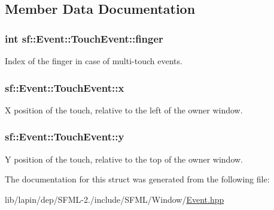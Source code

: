 \subsection{Member Data Documentation}
\hypertarget{structsf_1_1_event_1_1_touch_event_a9a79fe86bf9ac3c16ec7326f96feb61a}{
\subsubsection[{finger}]{ {\bf int} sf\-::\-Event\-::\-Touch\-Event\-::finger}}\label{structsf_1_1_event_1_1_touch_event_a9a79fe86bf9ac3c16ec7326f96feb61a}


Index of the finger in case of multi-\/touch events. 

\hypertarget{structsf_1_1_event_1_1_touch_event_a8993963790b850caa68b98d3cad2be45}{
\subsubsection[{x}]{ sf\-::\-Event\-::\-Touch\-Event\-::x}}\label{structsf_1_1_event_1_1_touch_event_a8993963790b850caa68b98d3cad2be45}


X position of the touch, relative to the left of the owner window. 

\hypertarget{structsf_1_1_event_1_1_touch_event_add80639dc68bc37e3275744d501cdbe0}{
\subsubsection[{y}]{ sf\-::\-Event\-::\-Touch\-Event\-::y}}\label{structsf_1_1_event_1_1_touch_event_add80639dc68bc37e3275744d501cdbe0}


Y position of the touch, relative to the top of the owner window. 



The documentation for this struct was generated from the following file\-:\begin{DoxyCompactItemize}
\item 
lib/lapin/dep/\-S\-F\-M\-L-\/2./include/\-S\-F\-M\-L/\-Window/\hyperlink{lib_2lapin_2dep_2_s_f_m_l-2_83_2include_2_s_f_m_l_2_window_2_event_8hpp}{Event.\-hpp}\end{DoxyCompactItemize}
